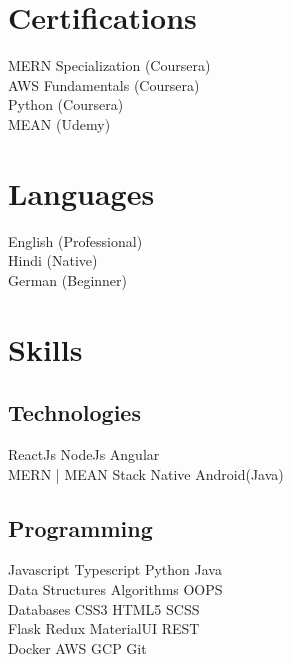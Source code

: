 \documentclass[]{deedy-resume-openfont}
\begin{document}
\begin{minipage}[t]{0.33\textwidth}

\section{Certifications}
MERN Specialization (Coursera) \\
AWS Fundamentals (Coursera) \\
Python (Coursera) \\
MEAN (Udemy) \\
\sectionsep
\section{Languages}
English (Professional) \\
Hindi (Native) \\
German (Beginner) \\
\sectionsep

\section{Skills}
\subsection{Technologies}
ReactJs \textbullet{} NodeJs \textbullet{} Angular \\
MERN | MEAN Stack \textbullet{} Native Android(Java) \\
\sectionsep

\subsection{Programming}
Javascript \textbullet{}   Typescript \textbullet{} Python \textbullet{} Java \\
Data Structures \textbullet{}   Algorithms \textbullet{} OOPS \\
Databases \textbullet{} CSS3 \textbullet{} HTML5 \textbullet{} SCSS \\
Flask \textbullet{} Redux \textbullet{} MaterialUI \textbullet{} REST \\
Docker \textbullet{} AWS \textbullet{} GCP \textbullet{} Git \\ 
%
%

\end{minipage} 
\end{document}
